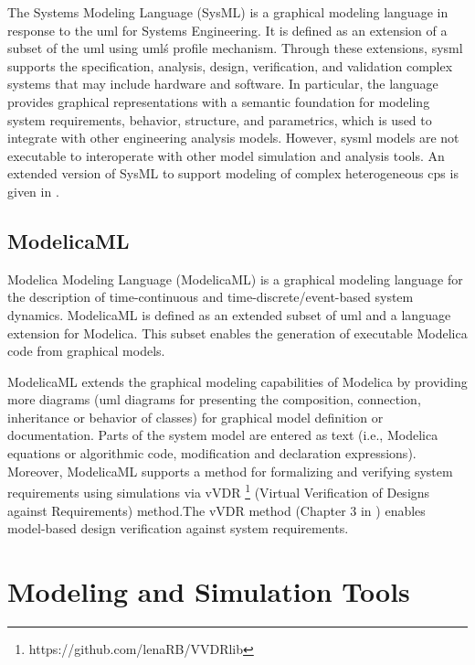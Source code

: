 The Systems Modeling Language (SysML) \cite{sysml} is a graphical modeling language in response to the \acrshort{uml} for Systems Engineering. It is defined as an extension of a subset of the \acrshort{uml} using \acrshort{uml}\'s profile mechanism. Through these extensions, \acrshort{sysml} supports the specification, analysis, design, verification, and validation complex systems that may include hardware and software. In particular, the language provides graphical representations with a semantic foundation for modeling system requirements, behavior, structure, and parametrics, which is used to integrate with other engineering analysis models. However, \acrshort{sysml} models are not executable to interoperate with other model simulation and analysis tools. An extended version of SysML to support modeling of complex heterogeneous \acrshort{cps} is given in \cite{mbsdjensen}. 

\subsection{ModelicaML}
\label{sec:modelicaml}

Modelica Modeling Language (ModelicaML) \cite{modelicaml, modelicamlreport} is a graphical modeling language for the description of time-continuous and time-discrete/event-based system dynamics. ModelicaML is defined as an extended subset of \acrshort{uml} and a language extension for Modelica. This subset enables the generation of executable Modelica code from graphical models.

ModelicaML extends the graphical modeling capabilities of Modelica by providing more diagrams (\acrshort{uml} diagrams for presenting the composition, connection, inheritance or behavior of classes) for graphical model definition or documentation.  Parts of the system model are entered as text (i.e., Modelica equations or algorithmic code, modification and declaration expressions). Moreover, ModelicaML supports a method for formalizing and verifying system requirements using simulations via vVDR \footnote{https://github.com/lenaRB/VVDRlib} (Virtual Verification of Designs against Requirements) method.The vVDR method (Chapter 3 in \cite{modelicamlwladimir, modelicamlverification}) enables model-based design verification against system requirements.


\section{Modeling and Simulation Tools}
\label{sec:tools}

